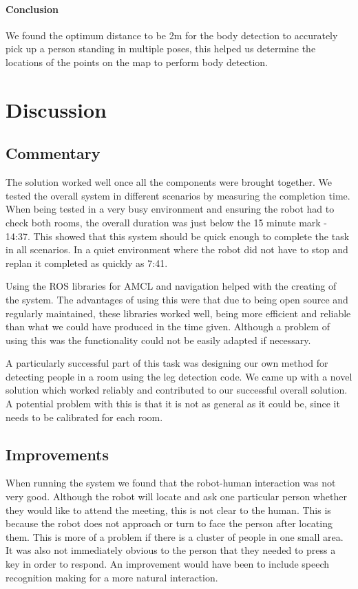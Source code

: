 \paragraph{Conclusion}

We found the optimum distance to be 2m for the body detection to accurately pick up a person standing in multiple poses, this helped us determine the locations of the points on the map to perform body detection.

\section{Discussion}

\subsection{Commentary}

The solution worked well once all the components were brought together. We tested the overall system in different scenarios by measuring the completion time. When being tested in a very busy environment and ensuring the robot had to check both rooms, the overall duration was just below the 15 minute mark - 14:37. This showed that this system should be quick enough to complete the task in all scenarios. In a quiet environment where the robot did not have to stop and replan it completed as quickly as 7:41.

Using the ROS libraries for AMCL and navigation helped with the creating of the system. The advantages of using this were that due to being open source and regularly maintained, these libraries worked well, being more efficient and reliable than what we could have produced in the time given. Although a problem of using this was the functionality could not be easily adapted if necessary.

A particularly successful part of this task was designing our own method for detecting people in a room using the leg detection code. We came up with a novel solution which worked reliably and contributed to our successful overall solution. A potential problem with this is that it is not as general as it could be, since it needs to be calibrated for each room.

\subsection{Improvements}

When running the system we found that the robot-human interaction was not very good. Although the robot will locate and ask one particular person whether they would like to attend the meeting, this is not clear to the human. This is because the robot does not approach or turn to face the person after locating them. This is more of a problem if there is a cluster of people in one small area. It was also not immediately obvious to the person that they needed to press a key in order to respond. An improvement would have been to include speech recognition making for a more natural interaction. 

